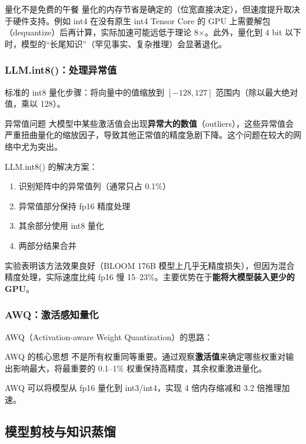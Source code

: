 \begin{warningbox}{量化不是免费的午餐}
量化的内存节省是确定的（位宽直接决定），但速度提升取决于硬件支持。例如 int4 在没有原生 int4 Tensor Core 的 GPU 上需要解包（dequantize）后再计算，实际加速可能远低于理论 8$\times$。此外，量化到 4 bit 以下时，模型的``长尾知识''（罕见事实、复杂推理）会显著退化。
\end{warningbox}

\subsubsection{LLM.int8()：处理异常值}

标准的 int8 量化步骤：将向量中的值缩放到 $[-128, 127]$ 范围内（除以最大绝对值，乘以 128）。

\begin{warningbox}{异常值问题}
大模型中某些激活值会出现\textbf{异常大的数值}（outliers），这些异常值会严重扭曲量化的缩放因子，导致其他正常值的精度急剧下降。这个问题在较大的网络中尤为突出。
\end{warningbox}

LLM.int8() 的解决方案：
\begin{enumerate}
    \item 识别矩阵中的异常值列（通常只占 0.1\%）
    \item 异常值部分保持 fp16 精度处理
    \item 其余部分使用 int8 量化
    \item 两部分结果合并
\end{enumerate}

实验表明该方法效果良好（BLOOM 176B 模型上几乎无精度损失），但因为混合精度处理，实际速度比纯 fp16 慢 15--23\%。主要优势在于\textbf{能将大模型装入更少的 GPU}。

\subsubsection{AWQ：激活感知量化}

AWQ（Activation-aware Weight Quantization）的思路：

\begin{importantbox}{AWQ 的核心思想}
不是所有权重同等重要。通过观察\textbf{激活值}来确定哪些权重对输出影响最大，将最重要的 0.1--1\% 权重保持高精度，其余权重激进量化。

AWQ 可以将模型从 fp16 量化到 int3/int4，实现 4 倍内存缩减和 3.2 倍推理加速。
\end{importantbox}

\subsection{模型剪枝与知识蒸馏}

